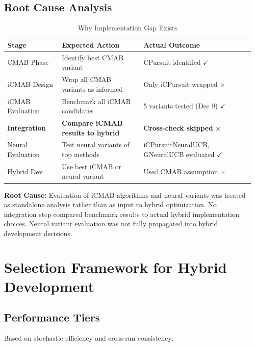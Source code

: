 \documentclass[12pt,a4paper]{article}
\newcommand{\warning}[1]{\textcolor{warningred}{\textbf{#1}}}
\begin{document}
\subsection{Root Cause Analysis}

\begin{table}[H]
\centering
\caption{Why Implementation Gap Exists}
\begin{tabular}{@{}lll@{}}
\toprule
\textbf{Stage} & \textbf{Expected Action} & \textbf{Actual Outcome} \\
\midrule
CMAB Phase & Identify best CMAB variant & CPursuit identified $\checkmark$ \\
iCMAB Design & Wrap all CMAB variants as informed & Only iCPursuit wrapped $\times$ \\
iCMAB Evaluation & Benchmark all iCMAB candidates & 5 variants tested (Dec 9) $\checkmark$ \\
\warning{Integration} & \warning{Compare iCMAB results to hybrid} & \warning{Cross-check skipped} $\times$ \\
Neural Evaluation & Test neural variants of top methods & iCPursuitNeuralUCB, GNeuralUCB evaluated $\checkmark$ \\
Hybrid Dev & Use best iCMAB or neural variant & Used CMAB assumption $\times$ \\
\bottomrule
\end{tabular}
\end{table}

\textbf{Root Cause:} Evaluation of iCMAB algorithms and neural variants was treated as standalone analysis rather than as input to hybrid optimization. No integration step compared benchmark results to actual hybrid implementation choices. Neural variant evaluation was not fully propagated into hybrid development decisions.

\section{Selection Framework for Hybrid Development}

\subsection{Performance Tiers}

Based on stochastic efficiency and cross-run consistency:
\end{document}
